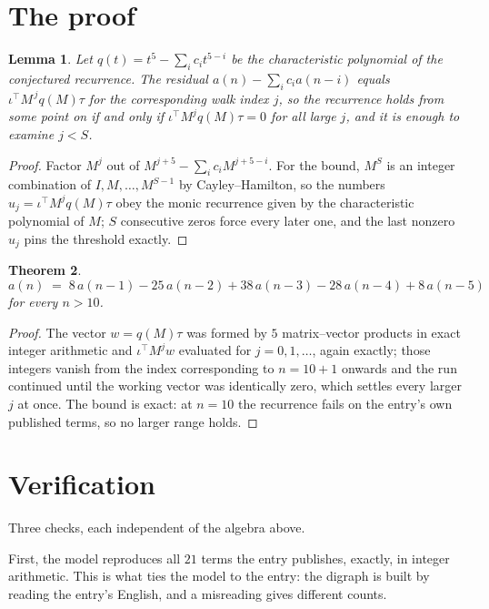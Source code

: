\documentclass[11pt,a4paper]{article}
\theoremstyle{plain}
\newtheorem{theorem}{Theorem}
\newtheorem{lemma}[theorem]{Lemma}
\theoremstyle{definition}
\begin{document}
\section{The proof}

\begin{lemma}\label{lem:crit}
Let $q(t)=t^{5}-\sum_i c_it^{5-i}$ be the characteristic polynomial of the
conjectured recurrence. The residual $a(n)-\sum_ic_ia(n-i)$ equals
$\iota^{\!\top}M^{\,j}q(M)\tau$ for the corresponding walk index $j$, so the recurrence
holds from some point on if and only if $\iota^{\!\top}M^{j}q(M)\tau=0$ for all large $j$,
and it is enough to examine $j<S$.
\end{lemma}

\begin{proof}
Factor $M^{j}$ out of $M^{j+5}-\sum_ic_iM^{j+5-i}$. For the bound, $M^{S}$
is an integer combination of $I,M,\dots,M^{S-1}$ by Cayley--Hamilton, so the numbers
$u_j=\iota^{\!\top}M^{j}q(M)\tau$ obey the monic recurrence given by the characteristic
polynomial of $M$; $S$ consecutive zeros force every later one, and the last nonzero $u_j$
pins the threshold exactly.
\end{proof}

\begin{theorem}
\[
a(n)\;=\;8\,a(n-1) - 25\,a(n-2) + 38\,a(n-3) - 28\,a(n-4) + 8\,a(n-5)
\]
for every $n>10$.
\end{theorem}

\begin{proof}
The vector $w=q(M)\tau$ was formed by $5$ matrix--vector products in exact integer
arithmetic and $\iota^{\!\top}M^{j}w$ evaluated for $j=0,1,\dots$, again exactly; those
integers vanish from the index corresponding to $n=10+1$ onwards and the run continued
until the working vector was identically zero, which settles every larger $j$ at once. The bound is exact: at $n=10$ the recurrence fails on the entry's own published terms, so no larger range holds.
\end{proof}

\section{Verification}

Three checks, each independent of the algebra above.

First, the model reproduces all $21$ terms the entry publishes, exactly, in integer
arithmetic. This is what ties the model to the entry: the digraph is built by reading the
entry's English, and a misreading gives different counts.
\end{document}
